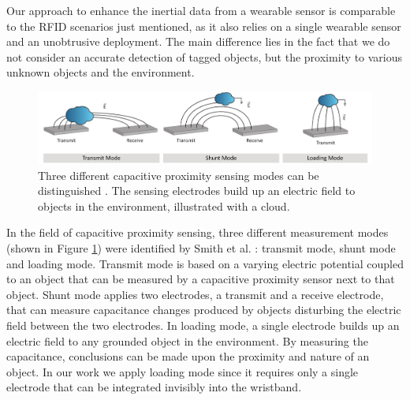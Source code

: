 \documentclass[runningheads,a4paper]{llncs}
\begin{document}
Our approach to enhance the inertial data from a wearable sensor is comparable to the RFID scenarios just mentioned, as it also relies on a single wearable sensor and an unobtrusive deployment. The main difference lies in the fact that we do not consider an accurate detection of tagged objects, but the proximity to various unknown objects and the environment. 


\begin{figure}
	\centering
		\includegraphics[width=1.00\textwidth]{Images/modes.pdf}
	\caption{Three different capacitive proximity sensing modes can be distinguished \cite{Smith1996}. The sensing electrodes build up an electric field to objects in the environment, illustrated with a cloud.}
	\label{fig:modes}
\end{figure}

In the field of capacitive proximity sensing, three different measurement modes (shown in Figure \ref{fig:modes}) were identified by Smith et al. \cite{Smith1999}: transmit mode, shunt mode and loading mode. Transmit mode is based on a varying electric potential coupled to an object that can be measured by a capacitive proximity sensor next to that object. Shunt mode applies two electrodes, a transmit and a receive electrode, that can measure capacitance changes produced by objects disturbing the electric field between the two electrodes. In loading mode, a single electrode builds up an electric field to any grounded object in the environment. By measuring the capacitance, conclusions can be made upon the proximity and nature of an object. In our work we apply loading mode since it requires only a single electrode that can be integrated invisibly into the wristband. 
\end{document}
